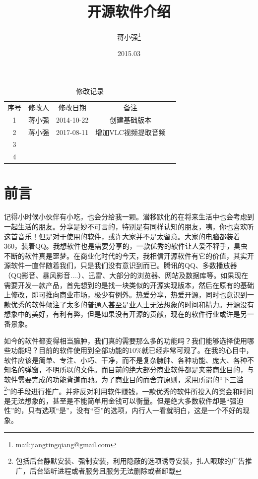 \documentclass{book}
\begin{document}
\title{开源软件介绍}		
\author{蒋小强\footnote{mail:jiangtingqiang@gmail.com}}
\date{2015.03}	

\maketitle %
\clearpage

\begin{table}\caption{修改记录}					
	\medskip
	\centering		
	\begin{tabular}{|c|c|c|c|c|}
		\hline
		\multirow{1}{*}{序号}
		& \multicolumn{1}{|c|}{修改人}  
		& \multicolumn{1}{|c|}{修改日期} 
		& \multicolumn{1}{|c|}{备注}\\			
		\cline{1-4}
		1 & 蒋小强 & 2014-10-22 & 创建基础版本\\
		\hline
		2 & 蒋小强 & 2017-08-11 & 增加VLC视频提取音频\\
		\hline
		3 & & &\\
		\hline
		4 & & &\\
		\hline
	\end{tabular}
\end{table}
\clearpage
\section{前言}

记得小时候小伙伴有小吃，也会分给我一颗。潜移默化的在将来生活中也会考虑到一起生活的朋友。分享是妙不可言的，特别是有同样认知的朋友，咦，你也喜欢听这首音乐！但是对于使用的软件，或许大家并不是太留意。大家的电脑都装着360，装着QQ。我想软件也是需要分享的，一款优秀的软件让人爱不释手，臭虫不断的软件真是噩梦。在商业化时代的今天，我相信开源软件有它的价值，其实开源软件一直伴随着我们，只是我们没有意识到而已。腾讯的QQ、多数播放器（QQ影音、暴风影音....）、迅雷、大部分的浏览器、网站及数据库等。如果现在需要开发一款产品，首先想到的是找一块类似的开源实现版本，然后在原有的基础上修改，即可推向商业市场，极少有例外。热爱分享，热爱开源，同时也意识到一款优秀的软件倾注了太多的普通人甚至是业人士无法想象的时间和精力。开源没有想象中的美好，有利有弊，但是如果没有开源的贡献，现在的软件行业或许是另一番景象。	

如今的软件都变得相当臃肿，我们真的需要那么多的功能吗？我们能够选择使用哪些功能吗？目前的软件使用到全部功能的10\%就已经非常可观了。在我的心目中，软件应该是简单、专注、小巧、干净，而不是复杂臃肿、各种功能、庞大、各种不知名的弹窗，不明所以的文件。而目前的绝大部分商业软件都是夹带商业目的，与软件需要完成的功能背道而驰。为了商业目的而舍弃原则，采用所谓的“下三滥\footnote{包括后台静默安装、强制安装，利用隐蔽的选项诱导安装，扎人眼球的广告推广，后台监听进程或者服务且服务无法删除或者卸载}”的手段进行推广。并非反对利用软件赚钱，一款优秀的软件所投入的资金和时间是无法想象的，甚至是不能简单用金钱可以衡量。但是绝大多数软件却是“强迫性”的，只有选项“是”，没有“否”的选项，内行人一看就明白，这是一个不好的现象。
\end{document}

